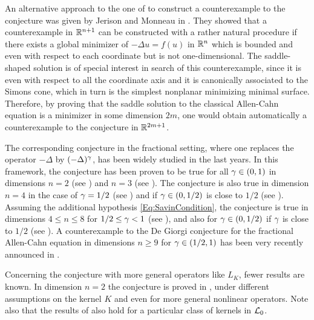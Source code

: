 An alternative approach to the one of \cite{delPinoKowalczykWei} to construct a counterexample to the conjecture was given by Jerison and Monneau in \cite{JerisonMonneau}. They showed that a counterexample in $\mathbb{R}^{n+1}$ can be constructed with a rather natural procedure if there exists a global minimizer of $-\Delta u = f(u)$ in $\mathbb{R}^n$ which is bounded and even with respect to each coordinate but is not one-dimensional. The saddle-shaped solution is of special interest in search of this counterexample, since it is even with respect to all the coordinate axis and it is canonically associated to the Simons cone, which in turn is the simplest nonplanar minimizing minimal surface. Therefore, by proving that the saddle solution to the classical Allen-Cahn equation is a minimizer in some dimension $2m$, one would obtain automatically a counterexample to the conjecture in $\mathbb{R}^{2m+1}$.

The corresponding conjecture in the fractional setting, where one replaces the operator $-\Delta$ by $(-\Delta)^\gamma$, has been widely studied in the last years. In this framework, the conjecture has been proven to be true for all $\gamma\in(0,1)$ in dimensions $n=2$ (see \cite{CabreSolaMorales,CabreSireI,SireValdinoci}) and $n=3$ (see \cite{CabreCinti-EnergyHalfL, CabreCinti-SharpEnergy,DipierroFarinaValdinoci}). The conjecture is also true in dimension $n=4$ in the case of $\gamma = 1/2$ (see \cite{FigalliSerra}) and if $\gamma\in(0,1/2)$ is close to $1/2$ (see \cite{CabreCintiSerra-Stable}). Assuming the additional hypothesis \eqref{Eq:SavinCondition}, the conjecture is true in dimensions $4\leq n \leq 8$ for $1/2 \leq \gamma < 1$ (see \cite{Savin-Fractional,Savin-Fractional2}), and also for $\gamma\in(0,1/2)$ if $\gamma$ is close to $1/2$ (see \cite{DipierroSerraValdinoci}). A counterexample to the De Giorgi conjecture for the fractional Allen-Cahn equation in dimensions $n \geq 9$ for $\gamma \in (1/2,1)$ has been very recently announced in \cite{ChanLiuWei}.

Concerning the conjecture with more general operators like $L_K$, fewer results are known. In dimension $n=2$ the conjecture is proved in \cite{HamelRosOtonSireValdinoci, Bucur, FazlySire}, under different assumptions on the kernel $K$ and even for more general nonlinear operators. Note also that the results of \cite{DipierroSerraValdinoci} also hold for a particular class of kernels in $\mathcal{L}_0$.



